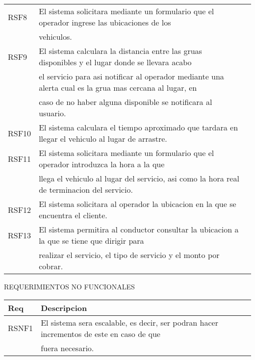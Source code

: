 \begin{description}
\begin{tabular}{||l | l | r||}
RSF8 & El sistema solicitara mediante un formulario que el operador ingrese las ubicaciones de los\\ & vehiculos. \\ \hline 
RSF9 & El sistema calculara la distancia entre las gruas disponibles y el lugar donde se llevara acabo \\ &el servicio para asi notificar al operador mediante una alerta cual es la grua mas cercana al lugar, en \\ &caso de no haber alguna disponible se notificara al usuario. \\ \hline 
RSF10 & El sistema calculara el tiempo aproximado que tardara en llegar el vehiculo al lugar de arrastre.\\ \hline 
RSF11 & El sistema solicitara mediante un formulario que el operador introduzca la hora a la que \\ &llega el vehiculo al lugar del servicio, asi como la hora real de terminacion del servicio. \\ \hline 
RSF12 & El sistema solicitara al operador la ubicacion en la que se encuentra el cliente. \\ \hline 
RSF13 & El sistema permitira al conductor consultar la ubicacion a la que se tiene que dirigir para\\ & realizar el servicio, el tipo de servicio y el monto por cobrar. \\ \hline  
\end{tabular}



\item REQUERIMIENTOS NO FUNCIONALES

\begin{tabular}{||l | l | r||} \hline \hline Req & Descripcion  \\ \hline
RSNF1 & El sistema sera escalable, es decir, ser podran hacer incrementos de este en caso de que \\ & fuera necesario. \\ \hline 
\end{tabular}





\end{description}
